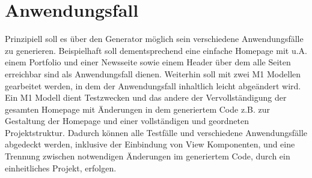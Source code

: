 \section{Anwendungsfall}
\label{Anwendungsfall}
Prinzipiell soll es über den Generator möglich sein verschiedene Anwendungsfälle
zu generieren. Beispielhaft soll dementsprechend eine
einfache Homepage mit u.A.
einem Portfolio und einer Newsseite sowie einem Header über dem alle Seiten
erreichbar sind als Anwendungsfall dienen. Weiterhin soll mit zwei
M1 Modellen gearbeitet werden, in dem der Anwendungsfall inhaltlich leicht
abgeändert wird.
Ein M1 Modell dient Testzwecken und das andere der Vervollständigung der
gesamten Homepage mit Änderungen in dem generiertem Code z.B. zur Gestaltung der
Homepage und einer vollständigen und geordneten Projektstruktur.
Dadurch können alle Testfälle und verschiedene Anwendungsfälle abgedeckt werden,
inklusive der Einbindung von View Komponenten, und eine Trennung zwischen notwendigen Änderungen im
generiertem Code, durch ein einheitliches Projekt, erfolgen.